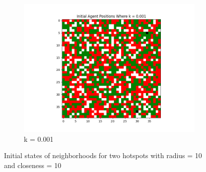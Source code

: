 \documentclass[11pt]{article}
\begin{document}
\begin{figure}[h]
\begin{subfigure}{0.2\textwidth}
			\includegraphics[width=\linewidth]{policy3_Initial_0001.png}
			\caption{\centering k = 0.001}
		\end{subfigure}\hfill
		\caption{Initial states of neighborhoods for two hotspots with radius = 10 and closeness = 10}
	\end{figure}
	\vspace{-2em} %
\end{document}
